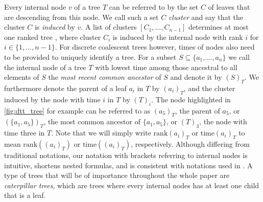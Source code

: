 \documentclass[11pt]{amsart}
\newcommand{\rank}{\mathrm{rank}}
\newcommand{\ntime}{\mathrm{time}}
\begin{document}
Every internal node $v$ of a tree $T$ can be referred to by the set $C$ of leaves that are descending from this node.
We call such a set $C$ \emph{cluster} and say that the cluster $C$ is \emph{induced} by $v$.
A list of clusters $[C_1, \ldots, C_{n-1}]$ determines at most one ranked tree \autocite{Collienne2020-iu}, where cluster $C_i$ is induced by the internal node with rank $i$ for $i \in \{1, \ldots, n-1\}$.
For discrete coalescent trees however, times of nodes also need to be provided to uniquely identify a tree.
For a subset $S \subseteq \{a_1, \ldots, a_n\}$ we call the internal node of a tree $T$ with lowest time among those ancestral to all elements of $S$ the \emph{most recent common ancestor} of $S$ and denote it by $(S)_T$.
We furthermore denote the parent of a leaf $a_i$ in $T$ by $(a_i)_T$, and the cluster induced by the node with time $i$ in $T$ by $(T)_i$.
The node highlighted in \autoref{fig:dtt_tree} for example can be referred to as $(a_5)_T$, the parent of $a_5$, or $(\{a_1, a_5\})_T$, the most common ancestor of $\{a_1, a_5\}$, or $(T)_3$, the node with time three in $T$.
Note that we will simply write $\rank(a_i)_T$ or $\ntime(a_i)_T$ to mean $\rank((a_i)_T)$ or $\ntime((a_i)_T)$, respectively.
Although differing from traditional notations, our notation with brackets referring to internal nodes is intuitive, shortens nested formulas, and is consistent with notations used in \autocite{Collienne2020-iu}.
A type of trees that will be of importance throughout the whole paper are \emph{caterpillar trees}, which are trees where every internal nodes has at least one child that is a leaf.
\end{document}
